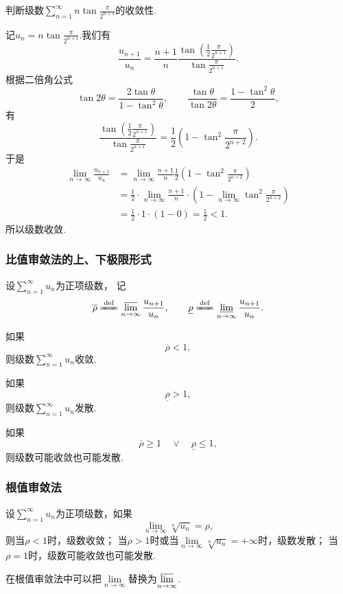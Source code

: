 \begin{example}
判断级数\(\sum\limits_{n=1}^\infty n \tan\frac{\pi}{2^{n+1}}\)的收敛性.
\begin{solution}
记\(u_n = n \tan\frac{\pi}{2^{n+1}}\).我们有\[
	\frac{u_{n+1}}{u_n}
	= \frac{n+1}{n} \frac{\tan(\frac{1}{2}\frac{\pi}{2^{n+1}})}{\tan\frac{\pi}{2^{n+1}}}.
\]
根据二倍角公式\[
	\tan2\theta = \frac{2\tan\theta}{1-\tan^2\theta},
	\qquad
	\frac{\tan\theta}{\tan2\theta} = \frac{1-\tan^2\theta}{2},
\]
有\[
	\frac{\tan(\frac{1}{2}\frac{\pi}{2^{n+1}})}{\tan\frac{\pi}{2^{n+1}}}
	= \frac{1}{2} \left(
		1-\tan^2\frac{\pi}{2^{n+2}}
	\right).
\]
于是\begin{align*}
	\lim\limits_{n\to\infty} \frac{u_{n+1}}{u_n}
	&= \lim\limits_{n\to\infty} \frac{n+1}{n} \frac{1}{2} \left(
		1-\tan^2\frac{\pi}{2^{n+2}}
	\right) \\
	&= \frac{1}{2} \cdot \lim\limits_{n\to\infty} \frac{n+1}{n} \cdot \left(
		1 - \lim\limits_{n\to\infty} \tan^2\frac{\pi}{2^{n+2}}
	\right) \\
	&= \frac{1}{2} \cdot 1 \cdot (1 - 0) = \frac{1}{2} < 1.
\end{align*}
所以级数收敛.
\end{solution}
\end{example}

\subsubsection{比值审敛法的上、下极限形式}
\begin{corollary}\label{theorem:无穷级数.正项级数的比值审敛法的上下极限形式}
\def\orho{\overline{\rho}}
\def\urho{\underline{\rho}}
设\(\sum\limits_{n=1}^\infty u_n\)为正项级数，
记\[
	\orho
	\defeq
	\varlimsup\limits_{n\to\infty} \frac{u_{n+1}}{u_n},
	\qquad
	\urho
	\defeq
	\varliminf\limits_{n\to\infty} \frac{u_{n+1}}{u_n}.
\]

如果\[
	\orho < 1,
\]
则级数\(\sum\limits_{n=1}^\infty u_n\)收敛.

如果\[
	\urho > 1,
\]
则级数\(\sum\limits_{n=1}^\infty u_n\)发散.

如果\[
	\orho \geq 1
	\quad\lor\quad
	\urho \leq 1,
\]
则级数可能收敛也可能发散.
\end{corollary}

\subsubsection{根值审敛法}
\begin{theorem}\label{theorem:无穷级数.正项级数的根值审敛法}
设\(\sum\limits_{n=1}^\infty u_n\)为正项级数，如果\[
\lim\limits_{n\to\infty} \sqrt[n]{u_n}=\rho,
\]则当\(\rho<1\)时，级数收敛；
当\(\rho>1\)时或当\(\lim\limits_{n\to\infty} \sqrt[n]{u_n}=+\infty\)时，级数发散；
当\(\rho=1\)时，级数可能收敛也可能发散.
\end{theorem}
在根值审敛法中可以把\(\lim\limits_{n\to\infty}\)替换为\(\varlimsup\limits_{n\to\infty}\).


